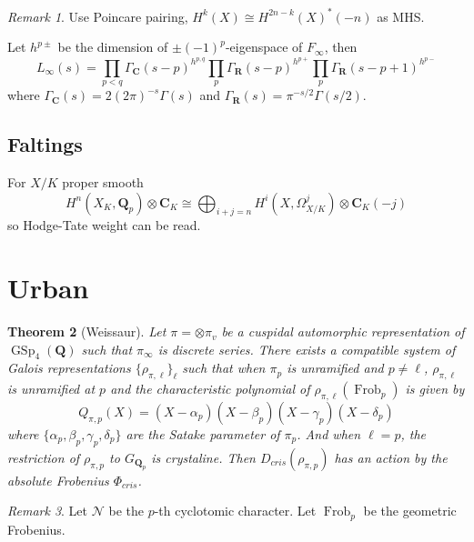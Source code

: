 \documentclass[leqno]{amsart}
\DeclareMathOperator{\GSp}{GSp}
\DeclareMathOperator{\Frob}{Frob}
\newcommand{\Q}{{\mathbf{Q}}}
\newcommand{\Qp}{\mathbf{Q}_p}
\newcommand{\C}{\mathbf C}
\newcommand{\R}{\mathbf R}
\newcommand{\1}{\mathbf{1}}
\newtheorem{thm}{Theorem}[section]
\theoremstyle{definition}
\theoremstyle{remark}
\newtheorem{rem}[thm]{Remark}
\begin{document}
\begin{rem}
	Use Poincare pairing,
	$H^k(X)\cong H^{2n-k}(X)^*(-n)$ 
	as MHS.
\end{rem}

Let $h^{p\pm}$ 
be the dimension of $\pm(-1)^p$-eigenspace of  $F_\infty$,
then
 \[
	 L_\infty(s)=
	 \prod_{p<q}\Gamma_\C(s-p)^{h^{p,q}}
	 \prod_{p}\Gamma_\R(s-p)^{h^{p+}}
	 \prod_{p}\Gamma_\R(s-p+1)^{h^{p-}}
\]
where $\Gamma_\C(s)=2(2\pi)^{-s}\Gamma(s)$
and $\Gamma_\R(s)=\pi^{-s/2}\Gamma(s/2)$.

\subsection{Faltings}
For $X/K$ proper smooth
 \[
	 H^n(X_{K},\Qp)\otimes \C_K\cong
	 \bigoplus_{i+j=n}
	 H^i(X,\Omega^j_{X/K})\otimes \C_K(-j)
\]
so Hodge-Tate weight can be read.

\section{Urban}

\begin{thm}[Weissaur]
	Let $\pi=\otimes\pi_v$
	be a cuspidal automorphic representation
	of  $\GSp_4(\Q)$ such that
	 $\pi_\infty$ is discrete series.
	 There exists a compatible system
	 of Galois representations  $\{\rho_{\pi,\ell}\}_\ell$
	 such that when $\pi_p$ is unramified and  $p\neq \ell$,
	  $\rho_{\pi,\ell}$ is unramified at $p$
	  and the characteristic polynomial of  
	  $\rho_{\pi,\ell}(\Frob_p)$ is given by 
	  \[
		  Q_{\pi,p}(X)=
		  (X-\alpha_p)
		  (X-\beta_p)
		  (X-\gamma_p)
		  (X-\delta_p)
	  \]
	  where $\{\alpha_p,\beta_p,\gamma_p,\delta_p\}$ 
	  are the Satake parameter of $\pi_p$.
	  And when $\ell=p$, 
	  the restriction of $\rho_{\pi,p}$
	  to $G_{\Q_p}$ is crystaline.
	  Then $D_{cris}(\rho_{\pi,p})$
	  has an action by the 
	  absolute Frobenius $\Phi_{cris}$.
\end{thm}

\begin{rem}
	Let $\mathcal{N}$
	be the  $p$-th cyclotomic character.
	Let $\Frob_p$ be the geometric Frobenius.
\end{rem}
\end{document}
